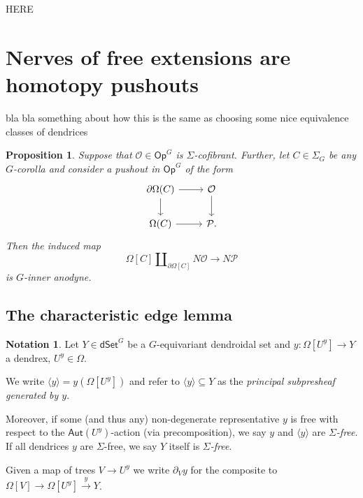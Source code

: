 \documentclass[a4paper,10pt
,draft
]{article}%
\numberwithin{equation}{section}
\numberwithin{figure}{section}
\newtheorem{proposition}[equation]{Proposition}%
\theoremstyle{definition} %
\newtheorem{notation}[equation]{Notation}%
\newcommand{\1}{\ensuremath{\mathbbm 1}}%
\begin{document}
{\color{red} HERE}


 
\section{Nerves of free extensions are homotopy pushouts}
\label{KEYRES SEC}






{\color{red} bla bla something about how this is the same as choosing some nice equivalence classes of dendrices}





\begin{proposition}\label{KEYPR PROP OLD}
	Suppose that $\mathcal{O} \in \mathsf{Op}^{G}$
	is $\Sigma$-cofibrant.
	Further, let $C \in \Sigma_G$ be any $G$-corolla and consider 
	a pushout in $\mathsf{Op}^{G}$ of the form
	\begin{equation}\label{PUSHOUTPROP EQ}
	\begin{tikzcd}
	\partial \Omega(C) \ar{r} \ar{d} & \mathcal{O} \ar{d}
	\\
	\Omega(C) \ar{r} & \mathcal{P}.
	\end{tikzcd}
	\end{equation}
	Then the induced map
	\begin{equation}\label{ANODYNE MAP}
	\Omega[C] \amalg_{\partial \Omega[C]} N\mathcal{O} \to N\mathcal{P}
	\end{equation}
	is $G$-inner anodyne.
\end{proposition}


\subsection{The characteristic edge lemma}


\begin{notation}
	Let $Y \in \mathsf{dSet}^G$ be a $G$-equivariant dendroidal set and 
	$y \colon \Omega[U^y] \to Y$
	a dendrex, $U^y \in \Omega$.
	
	We write $\langle y \rangle = y\left(  \Omega[U^y] \right)$
	and refer to
	$\langle y \rangle \subseteq Y$
	as the \emph{principal subpresheaf generated by $y$}.
	
	Moreover, if some (and thus any)
	non-degenerate representative $y$ is free 
	with respect to the $\mathsf{Aut}(U^y)$-action (via precomposition),
	we say $y$ and $\langle y \rangle$ are \emph{$\Sigma$-free}.
	If all dendrices $y$ are $\Sigma$-free, we say $Y$ itself is \textit{$\Sigma$-free}.
	
	Given a map of trees $V \to U^y$ we write $\partial_V y$ for the composite to $\Omega[V] \to \Omega[U^y] \xrightarrow{y} Y$.
\end{notation}
\end{document}

